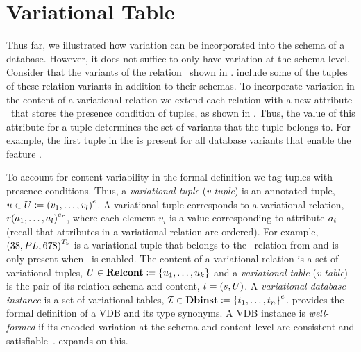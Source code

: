 \section{Variational Table}
\label{sec:vtab}


Thus far, 
we illustrated how variation can be incorporated into the schema of a database.
However, it does not suffice to only have variation at the schema level. Consider that the 
variants of the relation \empbio\ shown in . 
include some of the tuples of these relation variants in addition to their schemas. 
To incorporate variation in the content of a variational relation we
extend each relation with a new attribute \pcatt\ that stores 
the presence condition of tuples, as shown in
. Thus,
the value of this attribute for a tuple determines the set of variants that the tuple
belongs to. For example, the first tuple in the  is present for
all database variants that enable the feature \vThree. 


To account 
for content variability in the formal definition we tag tuples with 
presence conditions. 
%
Thus, a \emph{variational tuple} (\emph{v-tuple}) is an annotated tuple,
$\vTuple\in\vRelCont \eqq \annot[\dimMeta]{(\vi v \numAtts)}$. A
variational tuple corresponds to a variational relation,
$\vRel\annot[\dimMeta_\vRel]{(\vi \vAtt \numAtts)}$,
where each element $v_i$ is a value corresponding to attribute $\vAtt_i$
(recall that attributes in a variational relation are ordered).
%
For example, $\annot[\tFive]{(38, PL, 678)}$ is a variational tuple that belongs to the
\ecourse\ relation from  and is only present when \tFive\ is
enabled. 
%
The content of a variational relation
is a set of variational tuples,
$\vRelCont \in \vRelContSet \eqq \setDef {\vi \vTuple \numTuples}$
and 
%
a \emph{variational table} (\emph{v-table}) is the pair of its relation
schema and content, $\vTab = (\vRelSch, \vRelCont)$.
%
A \emph{variational database instance}
is a set of variational tables,
$\synDef \vdbInst  \vdbInstSet \eqq \annot [\dimMeta] {\setDef {\vi \vTab \numRels} }$.
%
 provides the formal definition of a VDB and its type synonyms.
A VDB instance is \emph{well-formed} if its encoded variation at
the schema and content level are consistent and satisfiable~\cite{ALW21vamos}.
 expands on this. 

